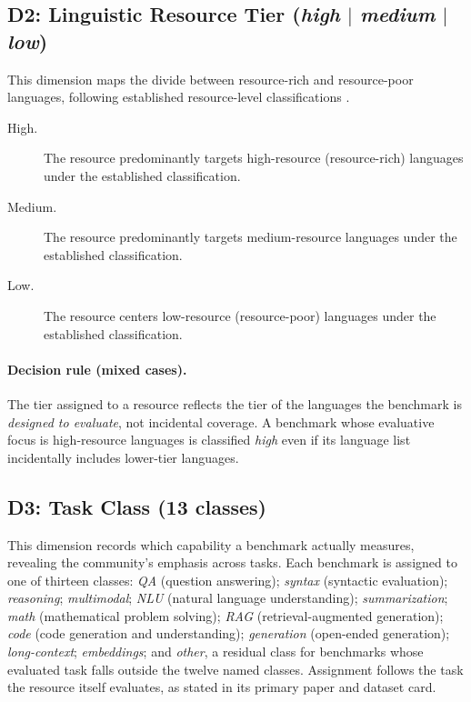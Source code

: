\documentclass[letterpaper]{article}
\begin{document}
\subsection{D2: Linguistic Resource Tier (\emph{high} $|$ \emph{medium} $|$ \emph{low})}
This dimension maps the divide between resource-rich and resource-poor languages, following established resource-level classifications \cite{joshi2020state}.
\begin{description}
\item[High.] The resource predominantly targets high-resource (resource-rich) languages under the established classification.
\item[Medium.] The resource predominantly targets medium-resource languages under the established classification.
\item[Low.] The resource centers low-resource (resource-poor) languages under the established classification.
\end{description}
\paragraph{Decision rule (mixed cases).} The tier assigned to a resource reflects the tier of the languages the benchmark is \emph{designed to evaluate}, not incidental coverage. A benchmark whose evaluative focus is high-resource languages is classified \emph{high} even if its language list incidentally includes lower-tier languages.

\subsection{D3: Task Class (13 classes)}
This dimension records which capability a benchmark actually measures, revealing the community's emphasis across tasks. Each benchmark is assigned to one of thirteen classes:
\emph{QA} (question answering);
\emph{syntax} (syntactic evaluation);
\emph{reasoning};
\emph{multimodal};
\emph{NLU} (natural language understanding);
\emph{summarization};
\emph{math} (mathematical problem solving);
\emph{RAG} (retrieval-augmented generation);
\emph{code} (code generation and understanding);
\emph{generation} (open-ended generation);
\emph{long-context};
\emph{embeddings};
and \emph{other}, a residual class for benchmarks whose evaluated task falls outside the twelve named classes. Assignment follows the task the resource itself evaluates, as stated in its primary paper and dataset card.
\end{document}
